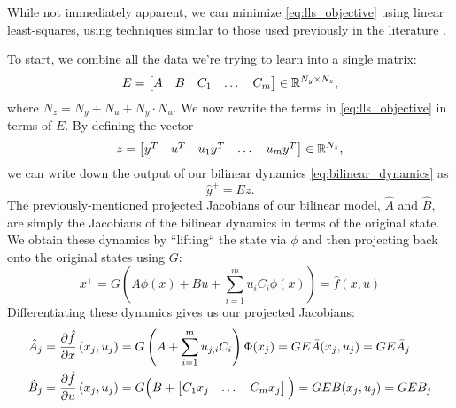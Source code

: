 \documentclass{article}
\begin{document}
While not immediately apparent, we can minimize \eqref{eq:lls_objective} using linear
least-squares, using techniques similar to those used previously in the literature
\cite{Folkestad2021}.

To start, we combine all the data we're trying to learn into a single matrix:
\begin{equation}
  E = \begin{bmatrix} A & B & C_1 & \dots & C_m \end{bmatrix} \in \mathbb{R}^{N_y \times N_z},
\end{equation}
where $N_z = N_y + N_u + N_y \cdot N_u$.  We now rewrite the terms in
\eqref{eq:lls_objective} in terms of $E$. By defining the vector 
\begin{equation}
  z = \begin{bmatrix} y^T & u^T & u_1 y^T & \dots & u_m y^T \end{bmatrix} \in \mathbb{R}^{N_z},
\end{equation}
we can write down 
the output of our bilinear dynamics \eqref{eq:bilinear_dynamics} as 
\begin{equation} \label{eq:bilinear_dynamics_z}
  \hat{y}^+ = E z.
\end{equation}
The previously-mentioned projected Jacobians of our bilinear model, $\hat{A}$ and
$\hat{B}$, are simply the Jacobians of the bilinear dynamics in terms of the original
state. We obtain these dynamics by ``lifting`` the state via $\phi$ and then projecting
back onto the original states using $G$:
\begin{equation} \label{eq:projected_dynamics}
  x^+ = G \left( A \phi(x) + B u + \sum_{i=1}^m u_i C_i \phi(x) \right)  = \hat{f}(x,u) 
\end{equation}
Differentiating these dynamics gives us our projected Jacobians:
\begin{subequations} \label{eq:projected_jacobians}
  \begin{align}
    \hat{A}_j &= \pdv{\hat{f}}{x}\left(x_j,u_j\right) 
    = G \left(A + \sum_{i=1}^m u_{j,i} C_i \right) \Phi(x_j)
    = G E \bar{A}(x_j,u_j) = G E \bar{A}_j \\
    \hat{B}_j &= \pdv{\hat{f}}{u}\left(x_j,u_j\right) 
    = G \Big(B + \begin{bmatrix} C_1 x_j & \dots & C_m x_j \end{bmatrix} \Big)
    = G E \bar{B}(x_j,u_j) = G E \bar{B}_j
  \end{align}
\end{subequations}
\end{document}
